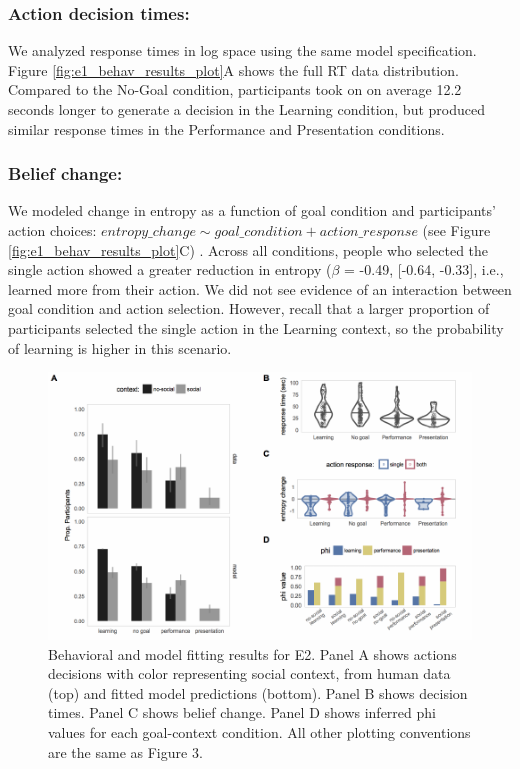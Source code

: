 \documentclass[10pt, letterpaper]{article}
\newenvironment{CodeChunk}{}{}
\begin{document}
\subsubsection{Action decision times:}\label{action-decision-times}

We analyzed response times in log space using the same model
specification. Figure \ref{fig:e1_behav_results_plot}A shows the full RT
data distribution. Compared to the No-Goal condition, participants took
on on average 12.2 seconds longer to generate a decision in the Learning
condition, but produced similar response times in the Performance and
Presentation conditions.

\subsubsection{Belief change:}\label{belief-change}

We modeled change in entropy as a function of goal condition and
participants' action choices:
\texttt{$entropy\_change \sim goal\_condition + action\_response$} (see
Figure \ref{fig:e1_behav_results_plot}C) . Across all conditions, people
who selected the single action showed a greater reduction in entropy
(\(\beta\) = -0.49, {[}-0.64, -0.33{]}, i.e., learned more from their
action. We did not see evidence of an interaction between goal condition
and action selection. However, recall that a larger proportion of
participants selected the single action in the Learning context, so the
probability of learning is higher in this scenario.

\begin{CodeChunk}
\begin{figure}[tb]

{\centering \includegraphics[width=0.95\linewidth]{figs/e2_results-1} 

}

\caption[Behavioral and model fitting results for E2]{Behavioral and model fitting results for E2. Panel A shows actions decisions with color representing social context, from human data (top) and fitted model predictions (bottom). Panel B shows decision times. Panel C shows belief change. Panel D shows inferred phi values for each goal-context condition. All other plotting conventions are the same as Figure 3.}\label{fig:e2_results}
\end{figure}
\end{CodeChunk}
\end{document}

